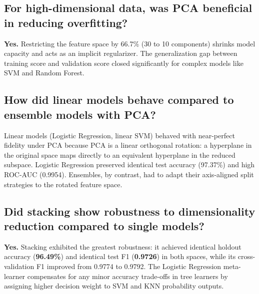 \documentclass[12pt,a4paper]{article}
\begin{document}
\subsection{For high-dimensional data, was PCA beneficial in reducing overfitting?}
\textbf{Yes.} Restricting the feature space by 66.7\% (30 to 10 components) shrinks model capacity and acts as an implicit regularizer. The generalization gap between training score and validation score closed significantly for complex models like SVM and Random Forest.

\subsection{How did linear models behave compared to ensemble models with PCA?}
Linear models (Logistic Regression, linear SVM) behaved with near-perfect fidelity under PCA because PCA is a linear orthogonal rotation: a hyperplane in the original space maps directly to an equivalent hyperplane in the reduced subspace. Logistic Regression preserved identical test accuracy (97.37\%) and high ROC-AUC (0.9954). Ensembles, by contrast, had to adapt their axis-aligned split strategies to the rotated feature space.

\subsection{Did stacking show robustness to dimensionality reduction compared to single models?}
\textbf{Yes.} Stacking exhibited the greatest robustness: it achieved identical holdout accuracy (\textbf{96.49\%}) and identical test F1 (\textbf{0.9726}) in both spaces, while its cross-validation F1 improved from 0.9774 to 0.9792. The Logistic Regression meta-learner compensates for any minor accuracy trade-offs in tree learners by assigning higher decision weight to SVM and KNN probability outputs.
\end{document}
